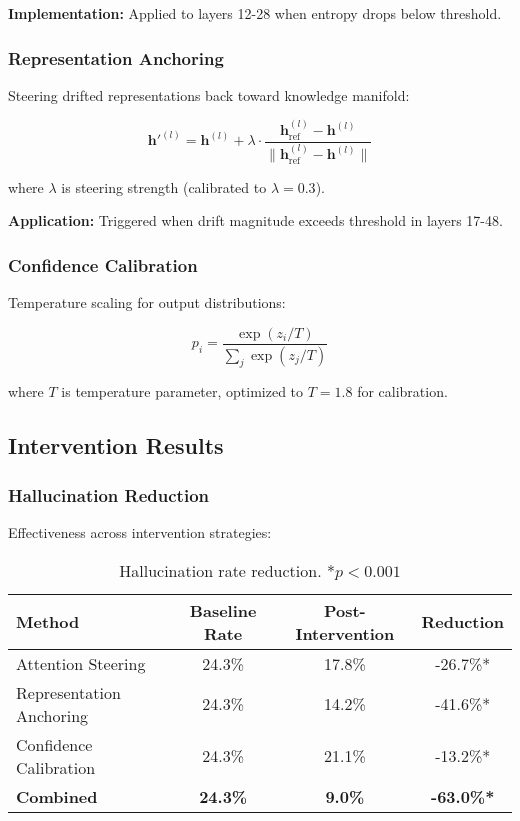 \documentclass[11pt]{article}
\begin{document}
\textbf{Implementation:} Applied to layers 12-28 when entropy drops below threshold.

\subsubsection{Representation Anchoring}

Steering drifted representations back toward knowledge manifold:

\begin{equation}
\mathbf{h}'^{(l)} = \mathbf{h}^{(l)} + \lambda \cdot \frac{\mathbf{h}_{\text{ref}}^{(l)} - \mathbf{h}^{(l)}}{\|\mathbf{h}_{\text{ref}}^{(l)} - \mathbf{h}^{(l)}\|}
\end{equation}

where $\lambda$ is steering strength (calibrated to $\lambda = 0.3$).

\textbf{Application:} Triggered when drift magnitude exceeds threshold in layers 17-48.

\subsubsection{Confidence Calibration}

Temperature scaling for output distributions:

\begin{equation}
p_i = \frac{\exp(z_i / T)}{\sum_j \exp(z_j / T)}
\end{equation}

where $T$ is temperature parameter, optimized to $T = 1.8$ for calibration.

\subsection{Intervention Results}

\subsubsection{Hallucination Reduction}

Effectiveness across intervention strategies:

\begin{table}[H]
\centering
\begin{tabular}{@{}lccc@{}}
\toprule
\textbf{Method} & \textbf{Baseline Rate} & \textbf{Post-Intervention} & \textbf{Reduction} \\ \midrule
Attention Steering & 24.3\% & 17.8\% & -26.7\%* \\
Representation Anchoring & 24.3\% & 14.2\% & -41.6\%* \\
Confidence Calibration & 24.3\% & 21.1\% & -13.2\%* \\
\textbf{Combined} & \textbf{24.3\%} & \textbf{9.0\%} & \textbf{-63.0\%*} \\ \bottomrule
\end{tabular}
\caption{Hallucination rate reduction. *$p < 0.001$}
\end{table}
\end{document}
